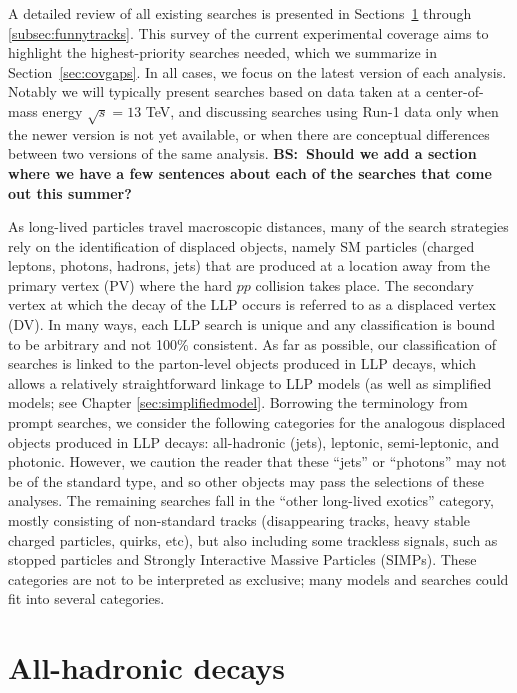 A detailed review of all existing searches is presented in Sections~\ref{subsec:djets} through \ref{subsec:funnytracks}.
This survey of the current experimental coverage aims to highlight the highest-priority searches needed, which we summarize in Section~\ref{sec:covgaps}.
In all cases, we focus on the latest version of each analysis. Notably we will typically present searches based on data taken at a center-of-mass energy $\sqrt{s}=13$ TeV,  and discussing searches using Run-1 data only when the newer version is not yet available, or when there are conceptual differences between two versions of the same analysis. {\bf BS:~Should we add a section where we have a few sentences about each of the searches that come out this summer?}

 As long-lived particles travel macroscopic distances, many of the search strategies rely on the identification of displaced objects, namely SM particles (charged leptons, photons, hadrons, jets) that are produced at a location away from the primary vertex (PV) where the hard $pp$ collision takes place. The secondary vertex at which the decay of the LLP occurs is referred to as a displaced vertex (DV). In many ways, each LLP search is unique and any classification is bound to be arbitrary and not 100\% consistent. As far as possible, our classification of searches is linked to the parton-level objects produced in LLP decays, which allows a relatively straightforward linkage to LLP models (as well as simplified models; see Chapter \ref{sec:simplifiedmodel}. Borrowing the terminology from prompt searches, we  consider the following categories for the analogous displaced objects produced in LLP decays: all-hadronic (jets), leptonic, semi-leptonic, and photonic. However, we caution the reader that these ``jets'' or ``photons'' may not be of the standard type, and so other objects may pass the selections of these analyses. The remaining searches  fall in the ``other long-lived exotics'' category, mostly consisting of non-standard tracks (disappearing tracks,  heavy stable charged particles, quirks, etc), but also including some trackless signals, such as stopped particles and Strongly Interactive Massive Particles (SIMPs). 
These categories are not to be interpreted as exclusive; many models and searches could fit into several categories.

\section{All-hadronic decays}
\label{subsec:djets}

